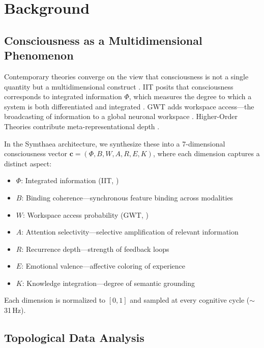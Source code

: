 \documentclass[11pt,a4paper]{article}
\begin{document}
\section{Background}
\label{sec:background}

\subsection{Consciousness as a Multidimensional Phenomenon}

Contemporary theories converge on the view that consciousness is not a single quantity but a multidimensional construct \citep{seth2022being, bayne2024tests}.
IIT posits that consciousness corresponds to integrated information $\Phi$, which measures the degree to which a system is both differentiated and integrated \citep{tononi2004information, tononi2015integrated}.
GWT adds workspace access---the broadcasting of information to a global neuronal workspace \citep{baars1988cognitive, dehaene2014consciousness}.
Higher-Order Theories contribute meta-representational depth \citep{rosenthal2005consciousness, lau2011empirical}.

In the Symthaea architecture, we synthesize these into a 7-dimensional consciousness vector $\mathbf{c} = (\Phi, B, W, A, R, E, K)$, where each dimension captures a distinct aspect:
\begin{itemize}
  \item $\Phi$: Integrated information (IIT, \citealp{tononi2004information})
  \item $B$: Binding coherence---synchronous feature binding across modalities
  \item $W$: Workspace access probability (GWT, \citealp{dehaene2011experimental})
  \item $A$: Attention selectivity---selective amplification of relevant information
  \item $R$: Recurrence depth---strength of feedback loops
  \item $E$: Emotional valence---affective coloring of experience
  \item $K$: Knowledge integration---degree of semantic grounding
\end{itemize}

Each dimension is normalized to $[0, 1]$ and sampled at every cognitive cycle ($\sim$31\,Hz).

\subsection{Topological Data Analysis}
\end{document}
